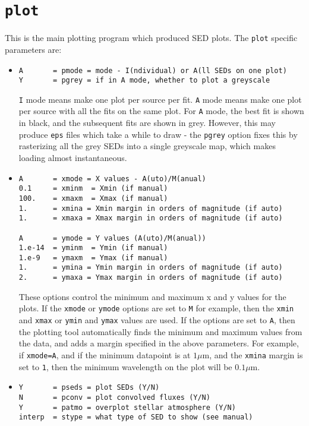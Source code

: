 \documentclass[letterpaper,11pt]{report}
\begin{document}
\section{\texttt{plot}}
\label{s:plot}

This is the main plotting program which produced SED plots. The \texttt{plot} specific parameters are:
\begin{itemize}
\item
\begin{verbatim}
A       = pmode = mode - I(ndividual) or A(ll SEDs on one plot)
Y       = pgrey = if in A mode, whether to plot a greyscale
\end{verbatim}
\texttt{I} mode means make one plot per source per fit. \texttt{A} mode means make one plot per source with all the fits on the same plot. For \texttt{A} mode, the best fit is shown in black, and the subsequent fits are shown in grey. However, this may produce \texttt{eps} files which take a while to draw - the \texttt{pgrey} option fixes this by rasterizing all the grey SEDs into a single greyscale map, which makes loading almost instantaneous.

\item
\begin{verbatim}
A       = xmode = X values - A(uto)/M(anual)
0.1     = xminm  = Xmin (if manual)
100.    = xmaxm  = Xmax (if manual)
1.      = xmina = Xmin margin in orders of magnitude (if auto)
1.      = xmaxa = Xmax margin in orders of magnitude (if auto)

A       = ymode = Y values (A(uto)/M(anual))
1.e-14  = yminm  = Ymin (if manual)
1.e-9   = ymaxm  = Ymax (if manual)
1.      = ymina = Ymin margin in orders of magnitude (if auto)
2.      = ymaxa = Ymax margin in orders of magnitude (if auto)
\end{verbatim}
These options control the minimum and maximum x and y values for the plots. If the \texttt{xmode} or \texttt{ymode} options are set to \texttt{M} for example, then the \texttt{xmin} and \texttt{xmax} or \texttt{ymin} and \texttt{ymax} values are used. If the options are set to \texttt{A}, then the plotting tool automatically finds the minimum and maximum values from the data, and adds a margin specified in the above parameters. For example, if \texttt{xmode=A}, and if the minimum datapoint is at $1\mu$m, and the \texttt{xmina} margin is set to \texttt{1}, then the minimum wavelength on the plot will be $0.1\mu$m.
 
\item
\begin{verbatim}
Y       = pseds = plot SEDs (Y/N)
N       = pconv = plot convolved fluxes (Y/N)
Y       = patmo = overplot stellar atmosphere (Y/N)
interp  = stype = what type of SED to show (see manual)


\end{verbatim}
\end{itemize}
\end{document}
